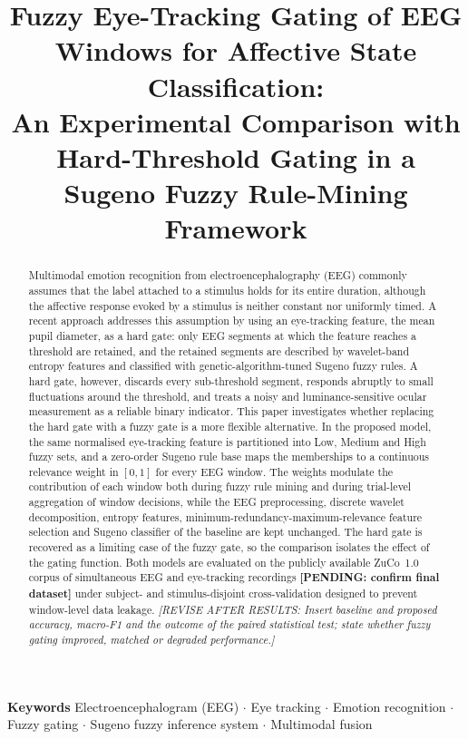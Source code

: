 \documentclass[11pt,a4paper]{article}
\title{Fuzzy Eye-Tracking Gating of EEG Windows for Affective State Classification:\\
An Experimental Comparison with Hard-Threshold Gating in a Sugeno Fuzzy Rule-Mining Framework}
\author{\pending{Author names and affiliations}}
\date{\pending{Preliminary draft --- 4 November 2026}}
\newcommand{\pending}[1]{\textcolor{red!75!black}{\textbf{[PENDING: #1]}}}
\newcommand{\revise}[1]{\textcolor{orange!80!black}{\textit{[REVISE AFTER RESULTS: #1]}}}
\newcommand{\dataset}{ZuCo~1.0}
\begin{document}
\maketitle

\begin{abstract}
\noindent
Multimodal emotion recognition from electroencephalography (EEG) commonly assumes that the label attached to a stimulus holds for its entire duration, although the affective response evoked by a stimulus is neither constant nor uniformly timed. A recent approach addresses this assumption by using an eye-tracking feature, the mean pupil diameter, as a hard gate: only EEG segments at which the feature reaches a threshold are retained, and the retained segments are described by wavelet-band entropy features and classified with genetic-algorithm-tuned Sugeno fuzzy rules. A hard gate, however, discards every sub-threshold segment, responds abruptly to small fluctuations around the threshold, and treats a noisy and luminance-sensitive ocular measurement as a reliable binary indicator. This paper investigates whether replacing the hard gate with a fuzzy gate is a more flexible alternative. In the proposed model, the same normalised eye-tracking feature is partitioned into Low, Medium and High fuzzy sets, and a zero-order Sugeno rule base maps the memberships to a continuous relevance weight in $[0,1]$ for every EEG window. The weights modulate the contribution of each window both during fuzzy rule mining and during trial-level aggregation of window decisions, while the EEG preprocessing, discrete wavelet decomposition, entropy features, minimum-redundancy-maximum-relevance feature selection and Sugeno classifier of the baseline are kept unchanged. The hard gate is recovered as a limiting case of the fuzzy gate, so the comparison isolates the effect of the gating function. Both models are evaluated on the publicly available \dataset{} corpus of simultaneous EEG and eye-tracking recordings \pending{confirm final dataset} under subject- and stimulus-disjoint cross-validation designed to prevent window-level data leakage. \revise{Insert baseline and proposed accuracy, macro-F1 and the outcome of the paired statistical test; state whether fuzzy gating improved, matched or degraded performance.}
\end{abstract}

\noindent\textbf{Keywords} Electroencephalogram (EEG) $\cdot$ Eye tracking $\cdot$ Emotion recognition $\cdot$ Fuzzy gating $\cdot$ Sugeno fuzzy inference system $\cdot$ Multimodal fusion
\end{document}
